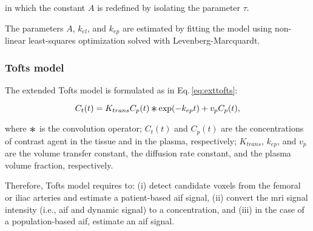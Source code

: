 \noindent in which the constant $A$ is redefined by isolating the parameter $\tau$.

The parameters $A$, $k_{el}$, and $k_{ep}$ are estimated by fitting the model using non-linear least-squares optimization solved with Levenberg-Marcquardt.

\subsubsection{Tofts model}\label{sec:tofts}

The extended Tofts model is formulated as in Eq.\,\eqref{eq:exttofts}:

\begin{equation}
  C_t(t) = K_{trans} C_p(t) \Conv \exp(-k_{ep}t) + v_p C_p(t),
  \label{eq:exttofts}
\end{equation}

\noindent where $\Conv$ is the convolution operator; $C_t(t)$ and $C_p(t)$ are the concentrations of contrast agent in the tissue and in the plasma, respectively; $K_{trans}$, $k_{ep}$, and $v_p$ are the volume transfer constant, the diffusion rate constant, and the plasma volume fraction, respectively.

Therefore, Tofts model requires to:
(i) detect candidate voxels from the femoral or iliac arteries and estimate a patient-based \ac{aif} signal,
(ii) convert the \ac{mri} signal intensity (i.e., \ac{aif} and dynamic signal) to a concentration, and
(iii) in the case of a population-based \ac{aif}, estimate an \ac{aif} signal.

